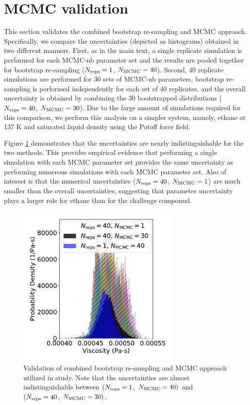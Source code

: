\documentclass[preprint,review,11pt]{elsarticle}
\begin{document}
	\section{MCMC validation} \label{SI:MCMC_analysis}
	
	This section validates the combined bootstrap re-sampling and MCMC approach. Specifically, we compare the uncertainties (depicted as histograms) obtained in two different manners. First, as in the main text, a single replicate simulation is performed for each MCMC-nb parameter set and the results are pooled together for bootstrap re-sampling ($N_{\rm reps} = 1$, $N_{\rm MCMC} = 40$). Second, 40 replicate simulations are performed for 30 sets of MCMC-nb parameters, bootstrap re-sampling is performed independently for each set of 40 replicates, and the overall uncertainty is obtained by combining the 30 bootstrapped distributions ($N_{\rm reps} = 40$, $N_{\rm MCMC} = 30$). Due to the large amount of simulations required for this comparison, we perform this analysis on a simpler system, namely, ethane at 137 K and saturated liquid density using the Potoff force field. 
	
	Figure \ref{fig:MCMC_validation} demonstrates that the uncertainties are nearly indistinguishable for the two methods. This provides empirical evidence that performing a single simulation with each MCMC parameter set provides the same uncertainty as performing numerous simulations with each MCMC parameter set. Also of interest is that the numerical uncertainties ($N_{\rm reps} = 40$, $N_{\rm MCMC} = 1$) are much smaller than the overall uncertainties, suggesting that parameter uncertainty plays a larger role for ethane than for the challenge compound.
	
	\begin{figure}[htb!]
		\centering
		\includegraphics[width=3.2in]{MCMC_validation.pdf}
		\caption{Validation of combined bootstrap re-sampling and MCMC approach utilized in study. Note that the uncertainties are almost indistinguishable between $(N_{\rm reps} = 1$, $N_{\rm MCMC} = 40)$ and $(N_{\rm reps} = 40$, $N_{\rm MCMC} = 30)$.}
		\label{fig:MCMC_validation}
	\end{figure}
	
\end{document}

